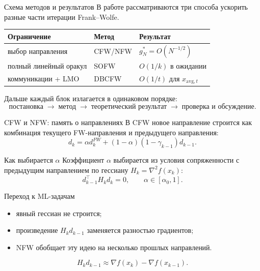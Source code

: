 \documentclass[aspectratio=169,10pt,pdf,hyperref={unicode}]{beamer}
\begin{document}
\begin{frame}{Схема методов и результатов}
\justifying
В работе рассматриваются три способа ускорить разные части итерации Frank--Wolfe.

\bigskip

\begin{center}
\begin{tabular}{lll}
\toprule
Ограничение & Метод & Результат \\
\midrule
выбор направления & CFW/NFW & $g_N^\ast=O(N^{-1/2})$ \\
полный линейный оракул & SOFW & $O(1/k)$ в ожидании \\
коммуникации + LMO & DBCFW & $O(1/t)$ для $x_{\mathrm{avg},t}$ \\
\bottomrule
\end{tabular}
\end{center}

\bigskip

Дальше каждый блок излагается в одинаковом порядке:
\[
    \text{постановка} \;\rightarrow\; \text{метод} \;\rightarrow\; \text{теоретический результат}
    \;\rightarrow\; \text{проверка и обсуждение}.
\]
\end{frame}

\begin{frame}{CFW и NFW: память о направлениях}
\justifying
В CFW новое направление строится как комбинация текущего FW-направления и предыдущего направления:
\[
    d_k
    =
    \alpha d_k^{FW}
    +
    (1-\alpha)(1-\gamma_{k-1})d_{k-1}.
\]

\vspace{-0.15cm}

\begin{block}{Как выбирается $\alpha$}
\justifying
Коэффициент $\alpha$ выбирается из условия сопряженности с предыдущим
направлением по гессиану $H_k=\nabla^2 f(x_k)$:
\[
    d_{k-1}^{\top}H_kd_k=0,
    \qquad
    \alpha\in[\alpha_0,1].
\]
\end{block}

\vspace{-0.1cm}

\begin{block}{Переход к ML-задачам}
\begin{itemize}
    \item явный гессиан не строится;
    \item произведение $H_kd_{k-1}$ заменяется разностью градиентов;
    \item NFW обобщает эту идею на несколько прошлых направлений.
\end{itemize}
\[
    H_kd_{k-1}
    \approx
    \nabla f(x_k)-\nabla f(x_{k-1}).
\]
\end{block}
\end{frame}
\end{document}
